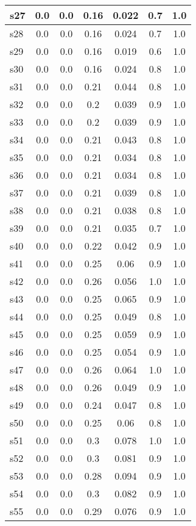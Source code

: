\documentclass{article}
\begin{document}
\begin{tabular}{|l|c|c|c|c|c|c|}
\hline
s27 &0.0 & 0.0 & 0.16 & 0.022 & 0.7 & 1.0\\
\hline
s28 &0.0 & 0.0 & 0.16 & 0.024 & 0.7 & 1.0\\
\hline
s29 &0.0 & 0.0 & 0.16 & 0.019 & 0.6 & 1.0\\
\hline
s30 &0.0 & 0.0 & 0.16 & 0.024 & 0.8 & 1.0\\
\hline
s31 &0.0 & 0.0 & 0.21 & 0.044 & 0.8 & 1.0\\
\hline
s32 &0.0 & 0.0 & 0.2 & 0.039 & 0.9 & 1.0\\
\hline
s33 &0.0 & 0.0 & 0.2 & 0.039 & 0.9 & 1.0\\
\hline
s34 &0.0 & 0.0 & 0.21 & 0.043 & 0.8 & 1.0\\
\hline
s35 &0.0 & 0.0 & 0.21 & 0.034 & 0.8 & 1.0\\
\hline
s36 &0.0 & 0.0 & 0.21 & 0.034 & 0.8 & 1.0\\
\hline
s37 &0.0 & 0.0 & 0.21 & 0.039 & 0.8 & 1.0\\
\hline
s38 &0.0 & 0.0 & 0.21 & 0.038 & 0.8 & 1.0\\
\hline
s39 &0.0 & 0.0 & 0.21 & 0.035 & 0.7 & 1.0\\
\hline
s40 &0.0 & 0.0 & 0.22 & 0.042 & 0.9 & 1.0\\
\hline
s41 &0.0 & 0.0 & 0.25 & 0.06 & 0.9 & 1.0\\
\hline
s42 &0.0 & 0.0 & 0.26 & 0.056 & 1.0 & 1.0\\
\hline
s43 &0.0 & 0.0 & 0.25 & 0.065 & 0.9 & 1.0\\
\hline
s44 &0.0 & 0.0 & 0.25 & 0.049 & 0.8 & 1.0\\
\hline
s45 &0.0 & 0.0 & 0.25 & 0.059 & 0.9 & 1.0\\
\hline
s46 &0.0 & 0.0 & 0.25 & 0.054 & 0.9 & 1.0\\
\hline
s47 &0.0 & 0.0 & 0.26 & 0.064 & 1.0 & 1.0\\
\hline
s48 &0.0 & 0.0 & 0.26 & 0.049 & 0.9 & 1.0\\
\hline
s49 &0.0 & 0.0 & 0.24 & 0.047 & 0.8 & 1.0\\
\hline
s50 &0.0 & 0.0 & 0.25 & 0.06 & 0.8 & 1.0\\
\hline
s51 &0.0 & 0.0 & 0.3 & 0.078 & 1.0 & 1.0\\
\hline
s52 &0.0 & 0.0 & 0.3 & 0.081 & 0.9 & 1.0\\
\hline
s53 &0.0 & 0.0 & 0.28 & 0.094 & 0.9 & 1.0\\
\hline
s54 &0.0 & 0.0 & 0.3 & 0.082 & 0.9 & 1.0\\
\hline
s55 &0.0 & 0.0 & 0.29 & 0.076 & 0.9 & 1.0\\

\end{tabular}
\end{document}

